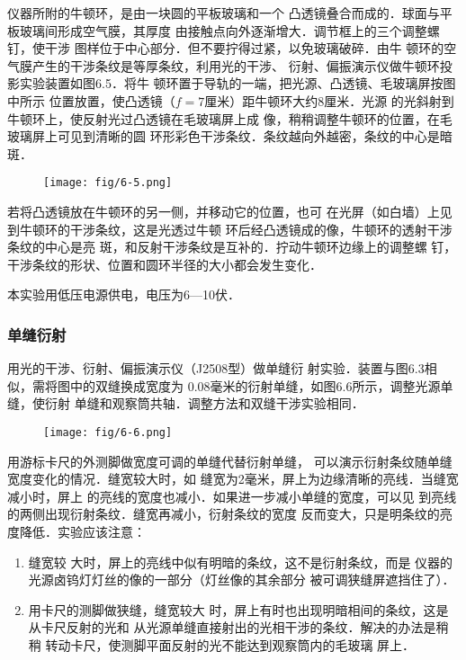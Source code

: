 仪器所附的牛顿环，是由一块圆的平板玻璃和一个
凸透镜叠合而成的．球面与平板玻璃间形成空气膜，其厚度
由接触点向外逐渐增大．调节框上的三个调整螺钉，使干涉
图样位于中心部分．但不要拧得过紧，以免玻璃破碎．由牛
顿环的空气膜产生的干涉条纹是等厚条纹，利用光的干涉、
衍射、偏振演示仪做牛顿环投影实验装置如图6.5．将牛
顿环置于导轨的一端，把光源、凸透镜、毛玻璃屏按图中所示
位置放置，使凸透镜（$f=7$厘米）距牛顿环大约8厘米．光源
的光斜射到牛顿环上，使反射光过凸透镜在毛玻璃屏上成
像，稍稍调整牛顿环的位置，在毛玻璃屏上可见到清晰的圆
环形彩色干涉条纹．条纹越向外越密，条纹的中心是暗
斑．

\begin{figure}[htp]
    \centering
    \texttt{[image: fig/6-5.png]}
    \caption{}
\end{figure}

若将凸透镜放在牛顿环的另一侧，并移动它的位置，也可
在光屏（如白墙）上见到牛顿环的干涉条纹，这是光透过牛顿
环后经凸透镜成的像，牛顿环的透射干涉条纹的中心是亮
斑，和反射干涉条纹是互补的．拧动牛顿环边缘上的调整螺
钉，干涉条纹的形状、位置和圆环半径的大小都会发生变化．

本实验用低压电源供电，电压为6—10伏．

\subsubsection{单缝衍射}
用光的干涉、衍射、偏振演示仪（J2508型）做单缝衍
射实验．装置与图6.3相似，需将图中的双缝换成宽度为
0.08毫米的衍射单缝，如图6.6所示，调整光源单缝，使衍射
单缝和观察筒共轴．调整方法和双缝干涉实验相同．
\begin{figure}[htp]
    \centering
    \texttt{[image: fig/6-6.png]}
    \caption{}
\end{figure}

用游标卡尺的外测脚做宽度可调的单缝代替衍射单缝，
可以演示衍射条纹随单缝宽度变化的情况．缝宽较大时，如
缝宽为2毫米，屏上为边缘清晰的亮线．当缝宽减小时，屏上
的亮线的宽度也减小．如果进一步减小单缝的宽度，可以见
到亮线的两侧出现衍射条纹．缝宽再减小，衍射条纹的宽度
反而变大，只是明条纹的亮度降低．实验应该注意：
\begin{enumerate}
\item 缝宽较
大时，屏上的亮线中似有明暗的条纹，这不是衍射条纹，而是
仪器的光源卤钨灯灯丝的像的一部分（灯丝像的其余部分
被可调狭缝屏遮挡住了）．
\item 用卡尺的测脚做狭缝，缝宽较大
时，屏上有时也出现明暗相间的条纹，这是从卡尺反射的光和
从光源单缝直接射出的光相干涉的条纹．解决的办法是稍稍
转动卡尺，使测脚平面反射的光不能达到观察筒内的毛玻璃
屏上．
\end{enumerate}


